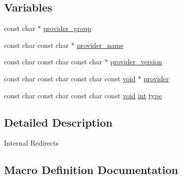 \subsection*{Variables}
\begin{DoxyCompactItemize}
\item 
const char $\ast$ \hyperlink{group__APACHE__CORE__REQ__AUTH_gaa7cfcf67c811adf57cf09ae7c5a60f0f}{provider\+\_\+group}
\item 
const char const char $\ast$ \hyperlink{group__APACHE__CORE__REQ__AUTH_ga50f9210dbbb0819b6faa866c8ebf67ed}{provider\+\_\+name}
\item 
const char const char const char $\ast$ \hyperlink{group__APACHE__CORE__REQ__AUTH_ga9fb21fc81724090b3e951a5dd729a8fb}{provider\+\_\+version}
\item 
const char const char const char const \hyperlink{group__MOD__ISAPI_gacd6cdbf73df3d9eed42fa493d9b621a6}{void} $\ast$ \hyperlink{group__APACHE__CORE__REQ__AUTH_ga9a45f8c72d54d0345f16cbd7478b03a9}{provider}
\item 
const char const char const char const \hyperlink{group__MOD__ISAPI_gacd6cdbf73df3d9eed42fa493d9b621a6}{void} \hyperlink{pcre_8txt_a42dfa4ff673c82d8efe7144098fbc198}{int} \hyperlink{group__APACHE__CORE__REQ__AUTH_ga5808ccd8f07b0db619015bb67a7a98ad}{type}
\end{DoxyCompactItemize}


\subsection{Detailed Description}
Internal Redirects 

\subsection{Macro Definition Documentation}
